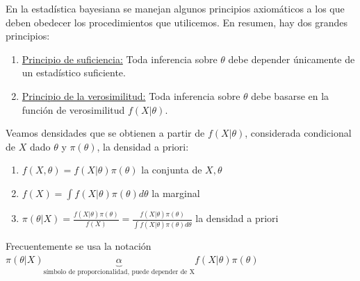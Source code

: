 \documentclass[10pt]{article}
\theoremstyle{plain}
\theoremstyle{definition}
\begin{document}
En la estadística bayesiana se manejan algunos principios axiomáticos a los que deben obedecer los procedimientos que utilicemos. En resumen, hay dos grandes principios:
\begin{enumerate}
\item \underline{Principio de suficiencia:} Toda inferencia sobre $\theta$ debe depender únicamente de un estadístico suficiente.
\item \underline{Principio de la verosimilitud:} Toda inferencia sobre $\theta$ debe basarse en la función de verosimilitud $f(X|\theta)$.
\end{enumerate}
Veamos densidades que se obtienen a partir de $f(X|\theta)$, considerada condicional de $X$ dado $\theta$ y $\pi(\theta)$, la densidad a priori:
\begin{enumerate}
\item $f(X,\theta) = f(X|\theta)\pi(\theta)$ la conjunta de $X,\theta$
\item $f(X) = \int f(X|\theta)\pi(\theta)d\theta$ la marginal
\item $\pi(\theta|X) = \frac{f(X|\theta)\pi(\theta)}{f(X)} = \frac{f(X|\theta)\pi(\theta)}{\int f(X|\theta)\pi(\theta)d\theta}$ la densidad a priori
\end{enumerate}
Frecuentemente se usa la notación $\pi(\theta|X) \underbrace{\alpha}_{\text{símbolo de proporcionalidad, puede depender de X}} f(X|\theta)\pi(\theta)$\\
\end{document}
